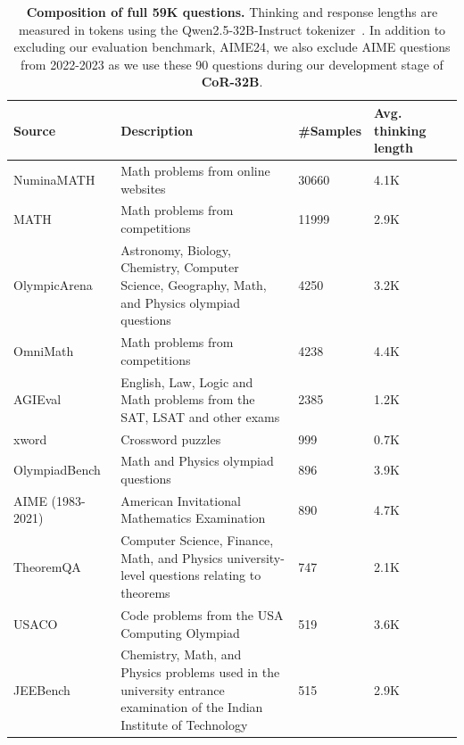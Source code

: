 \documentclass{article}
\theoremstyle{plain}
\theoremstyle{definition}
\theoremstyle{remark}
\newcommand{\model}{\textbf{CoR-32B}}
\begin{document}
\begin{table}[htbp]
\centering
\caption{\textbf{Composition of full 59K questions.}
Thinking and response lengths are measured in tokens using the Qwen2.5-32B-Instruct tokenizer~\citep{qwen2024qwen25technicalreport}. In addition to excluding our evaluation benchmark, AIME24, we also exclude AIME questions from 2022-2023 as we use these 90 questions during our development stage of \model{}.}
\begin{tabular}{>{\raggedright}p{4.7cm} p{5.4cm} p{1.2cm} p{1.2cm} p{1.2cm}}
\toprule
Source & Description & \#Samples & Avg. thinking length \\
\midrule
NuminaMATH~\citep{numina_math_datasets} & Math problems from online websites & 30660 & 4.1K \\
MATH~\citep{hendrycks2021measuringmathematicalproblemsolving} & Math problems from competitions & 11999 & 2.9K \\
OlympicArena~\citep{huang2024olympicarenabenchmarkingmultidisciplinecognitive} & Astronomy, Biology, Chemistry, Computer Science, Geography, Math, and Physics olympiad questions & 4250 & 3.2K\\
OmniMath~\citep{gao2024omnimathuniversalolympiadlevel} & Math problems from competitions & 4238 & 4.4K\\
AGIEval~\citep{zhong2023agievalhumancentricbenchmarkevaluating,ling2017programinductionrationalegeneration,hendrycks2021measuringmathematicalproblemsolving,liu2020logiqachallengedatasetmachine,zhong2019jecqalegaldomainquestionanswering,wang2021lsatprogresschallengescomplex} & English, Law, Logic and Math problems from the SAT, LSAT and other exams & 2385 & 1.2K\\
xword & Crossword puzzles & 999 & 0.7K \\
OlympiadBench~\citep{he2024olympiadbenchchallengingbenchmarkpromoting} & Math and Physics olympiad questions & 896 & 3.9K\\
AIME (1983-2021) & American Invitational Mathematics Examination & 890 & 4.7K \\
TheoremQA~\citep{chen2023theoremqatheoremdrivenquestionanswering} & Computer Science, Finance, Math, and Physics university-level questions relating to theorems  & 747 & 2.1K \\
USACO \citep{shi2024languagemodelssolveolympiad} & Code problems from the USA Computing Olympiad & 519 & 3.6K \\
JEEBench~\citep{arora2023llmsadvancedenoughchallenging} & Chemistry, Math, and Physics problems used in the university entrance examination of the Indian Institute of Technology & 515 & 2.9K \\

\end{tabular}
\end{table}
\end{document}
